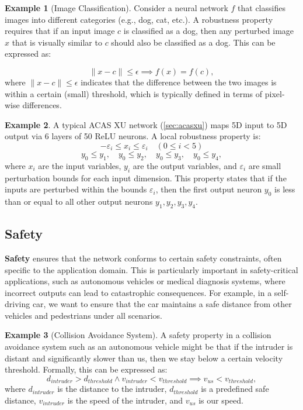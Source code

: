 \documentclass[oneside,11pt,dvipsnames]{book}
\numberwithin{equation}{section}
\theoremstyle{definition}
\newtheorem{example}{Example}[section]
\theoremstyle{remark}
\newcommand{\tvn}[1]{\iftoggle{usecomment}{{\color{red}{[TVN]: #1}}}{}}
\newcommand{\hd}[1]{\iftoggle{usecomment}{{\color{blue}{[HD]: #1}}}{}}
\begin{document}
\begin{example}[Image Classification]
Consider a neural network $f$ that classifies images into different categories (e.g., dog, cat, etc.). A robustness property requires that if an input image $c$ is classified as a dog, then any perturbed image $x$ that is visually similar to $c$ should also be classified as a dog. This can be expressed as:

\[
\|x - c\| \leq \epsilon \implies f(x) = f(c), 
\]
where $\|x - c\| \leq \epsilon$ indicates that the difference between the two images is within a certain (small) threshold, which is typically defined in terms of pixel-wise differences. \tvn{is this local or global robustness?}
\end{example}




\begin{example}\label{ex:acas-robustness}
A typical ACAS XU network (\autoref{sec:acasxu}) maps 5D input to 5D output via 6 layers of 50 ReLU neurons. A local robustness property is:
\[
-\varepsilon_i \leq x_i \leq \varepsilon_i \quad (0 \leq i < 5)
\]
\[
y_0 \leq y_1, \quad y_0 \leq y_2, \quad y_0 \leq y_3, \quad y_0 \leq y_4,
\]
where $x_i$ are the input variables, $y_i$ are the output variables, and $\varepsilon_i$ are small perturbation bounds for each input dimension. This property states that if the inputs are perturbed within the bounds $\varepsilon_i$, then the first output neuron $y_0$ is less than or equal to all other output neurons $y_1, y_2, y_3, y_4$.\tvn{Hai, is this local?}\hd{yes, it is local.}
\end{example}
\subsection{Safety}


\textbf{Safety} ensures that the network conforms to certain safety constraints, often specific to the application domain. This is particularly important in safety-critical applications, such as autonomous vehicles or medical diagnosis systems, where incorrect outputs can lead to catastrophic consequences. For example, in a self-driving car, we want to ensure that the car maintains a safe distance from other vehicles and pedestrians under all scenarios.

\begin{example}[Collision Avoidance System]
    A safety property in a collision avoidance system such as an autonomous vehicle might be that if the intruder is distant and significantly slower than us, then we stay below a certain velocity threshold. Formally, this can be expressed as:
\[
d_{intruder} > d_{threshold} \land v_{intruder} < v_{threshold} \implies v_{us} < v_{threshold},
\]
where $d_{intruder}$ is the distance to the intruder, $d_{threshold}$ is a predefined safe distance, $v_{intruder}$ is the speed of the intruder, and $v_{us}$ is our speed.
\end{example}
\end{document}
